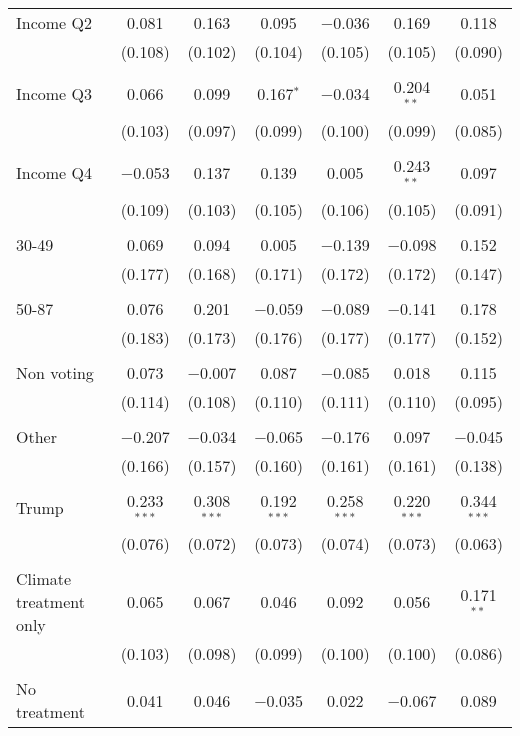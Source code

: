\begin{tabular}{@{\extracolsep{5pt}}lcccccc}
 Income Q2 & 0.081 & 0.163 & 0.095 & $-$0.036 & 0.169 & 0.118 \\ 
  & (0.108) & (0.102) & (0.104) & (0.105) & (0.105) & (0.090) \\ 
  & & & & & & \\ 
 Income Q3 & 0.066 & 0.099 & 0.167$^{*}$ & $-$0.034 & 0.204$^{**}$ & 0.051 \\ 
  & (0.103) & (0.097) & (0.099) & (0.100) & (0.099) & (0.085) \\ 
  & & & & & & \\ 
 Income Q4 & $-$0.053 & 0.137 & 0.139 & 0.005 & 0.243$^{**}$ & 0.097 \\ 
  & (0.109) & (0.103) & (0.105) & (0.106) & (0.105) & (0.091) \\ 
  & & & & & & \\ 
 30-49 & 0.069 & 0.094 & 0.005 & $-$0.139 & $-$0.098 & 0.152 \\ 
  & (0.177) & (0.168) & (0.171) & (0.172) & (0.172) & (0.147) \\ 
  & & & & & & \\ 
 50-87 & 0.076 & 0.201 & $-$0.059 & $-$0.089 & $-$0.141 & 0.178 \\ 
  & (0.183) & (0.173) & (0.176) & (0.177) & (0.177) & (0.152) \\ 
  & & & & & & \\ 
 Non voting & 0.073 & $-$0.007 & 0.087 & $-$0.085 & 0.018 & 0.115 \\ 
  & (0.114) & (0.108) & (0.110) & (0.111) & (0.110) & (0.095) \\ 
  & & & & & & \\ 
 Other & $-$0.207 & $-$0.034 & $-$0.065 & $-$0.176 & 0.097 & $-$0.045 \\ 
  & (0.166) & (0.157) & (0.160) & (0.161) & (0.161) & (0.138) \\ 
  & & & & & & \\ 
 Trump & 0.233$^{***}$ & 0.308$^{***}$ & 0.192$^{***}$ & 0.258$^{***}$ & 0.220$^{***}$ & 0.344$^{***}$ \\ 
  & (0.076) & (0.072) & (0.073) & (0.074) & (0.073) & (0.063) \\ 
  & & & & & & \\ 
 Climate treatment only & 0.065 & 0.067 & 0.046 & 0.092 & 0.056 & 0.171$^{**}$ \\ 
  & (0.103) & (0.098) & (0.099) & (0.100) & (0.100) & (0.086) \\ 
  & & & & & & \\ 
 No treatment & 0.041 & 0.046 & $-$0.035 & 0.022 & $-$0.067 & 0.089 \\ 

\end{tabular}
